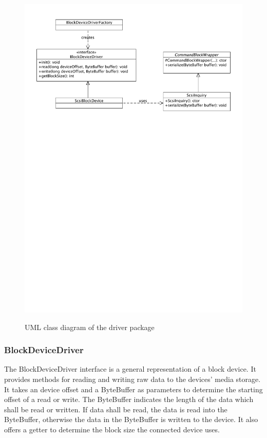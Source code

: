 \begin{figure}[h!]
\caption{UML class diagram of the driver package}
\centering
\includegraphics[scale=0.85]{figures/driver_package}
\label{figure:driver_package}
\end{figure}

\subsubsection{BlockDeviceDriver}

The BlockDeviceDriver interface is a general representation of a block device. It provides methods for reading and writing raw data to the devices' media storage. It takes an device offset and a ByteBuffer as parameters to determine the starting offset of a read or write. The ByteBuffer indicates the length of the data which shall be read or written. If data shall be read, the data is read into the ByteBuffer, otherwise the data in the ByteBuffer is written to the device. It also offers a getter to determine the block size the connected device uses.

